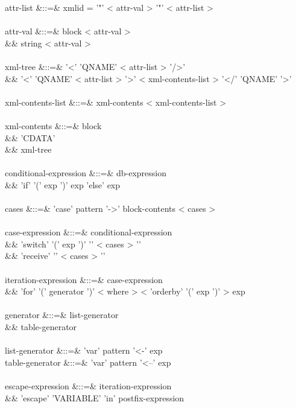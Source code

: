 \documentclass[11pt,a4paper]{article}
\begin{document}
\begin{grammar}
attr-list &::=& xmlid = '"' < attr-val > '"' < attr-list >  \\
\\
attr-val &::=& block < attr-val > \\
&&             string < attr-val >  \\
\\
xml-tree &::=& '<' 'QNAME' < attr-list > '/>' \\
&&             '<' 'QNAME' < attr-list > '>' < xml-contents-list > '</' 'QNAME' '>' \\
\\
xml-contents-list &::=& xml-contents < xml-contents-list > \\
\\
xml-contents &::=& block \\
&&                 'CDATA' \\
&&                 xml-tree \\
\\
conditional-expression &::=& db-expression \\
&&                           'if' '(' exp ')' exp 'else' exp \\
\\
cases &::=& 'case' pattern '->' block-contents < cases >  \\
\\
case-expression &::=&  conditional-expression \\
&&                     'switch' '(' exp ')' '{' < cases > '}' \\
&&                     'receive' '{' < cases > '}' \\
\\
iteration-expression &::=& case-expression \\
&&                         'for' '(' generator ')' < where > < 'orderby' '(' exp ')' > exp \\
\\
generator &::=&  list-generator \\
&&               table-generator \\
\\
list-generator  &::=& 'var' pattern '<-' exp \\
table-generator &::=& 'var' pattern '<--' exp \\
\\
escape-expression &::=& iteration-expression \\
&&                      'escape' 'VARIABLE' 'in' postfix-expression \\
\\

\end{grammar}
\end{document}
